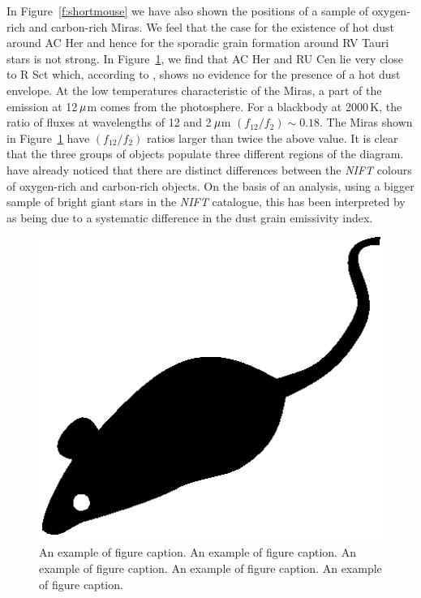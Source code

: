 \documentclass[useAMS,usenatbib, referree]{biom}
\begin{document}
In Figure~\ref{f:shortmouse} we have also shown the positions of a
sample of oxygen-rich and carbon-rich Miras.  We feel that the case
for the existence of hot dust around AC Her and hence for the sporadic
grain formation around RV Tauri stars is not strong. In
Figure~\ref{f:bigmouse}, we find that AC Her and RU Cen lie very close
to R Sct which, according to \citet{b9}, shows no evidence for the
presence of a hot dust envelope. At the low temperatures
characteristic of the Miras, a part of the emission at 12$\,\mu$m
comes from the photosphere.  For a blackbody at 2000$\,$K, the ratio
of fluxes at wavelengths of 12 and 2$\,\mu$m $(f_{12}/f_{2})\sim
0.18$. The Miras shown in Figure~\ref{f:bigmouse} have
$(f_{12}/f_{2})$ ratios larger than twice the above value. It is clear
that the three groups of objects populate three different regions of
the diagram. \citet{b10} have already noticed that there are distinct
differences between the {\it NIFT\/} colours of oxygen-rich and
carbon-rich objects. On the basis of an analysis, using a bigger
sample of bright giant stars in the {\it NIFT\/} catalogue, this has
been interpreted by as being due to a systematic
difference in the dust grain emissivity index.

\begin{figure}
  \centerline{\includegraphics[width=4.5in]{mouse.eps}}
  \caption{An example of figure caption. An example of 
  figure caption. An example of figure caption. An example of
   figure caption. An example of figure caption.}
\label{f:bigmouse}
\end{figure}
\end{document}
